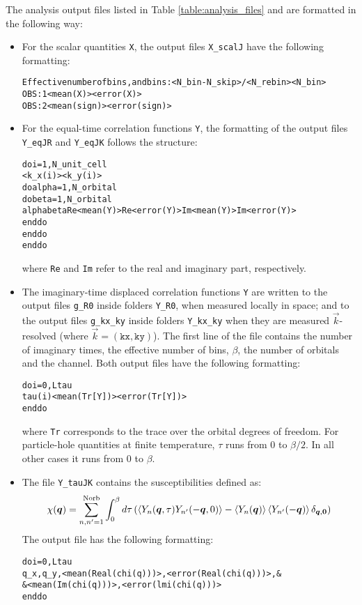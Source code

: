 %
The analysis output files listed in Table \ref{table:analysis_files} and are formatted in the following way:
\begin{itemize}
	\item For the scalar quantities \texttt{X}, the output files  \texttt{X\_scalJ} have the following formatting:
	{\small \begin{alltt}
		Effective number of bins, and bins:  <N_bin - N_skip>/<N_rebin>  <N_bin>	
		OBS :  1    <mean(X)>      <error(X)>	
		OBS :  2    <mean(sign)>   <error(sign)>
	\end{alltt} }
	
	\item For the equal-time correlation functions \texttt{Y}, the formatting of the output files \texttt{Y\_eqJR} and \texttt{Y\_eqJK} follows the structure:
	{\small \begin{alltt}
		do i = 1, N_unit_cell
		   <k_x(i)>   <k_y(i)>
		   do alpha = 1, N_orbital
		      do beta  = 1, N_orbital
		         alpha  beta  Re<mean(Y)>  Re<error(Y)>  Im<mean(Y)>  Im<error(Y)>
		      enddo
		   enddo
		enddo
	\end{alltt} }
	where \texttt{Re} and \texttt{Im} refer to the real and imaginary part, respectively.
	
	\item The imaginary-time displaced correlation functions \texttt{Y} are written to the output files \texttt{g\_R0} inside folders \texttt{Y\_R0}, when measured locally in space; 
	and to the output files \texttt{g\_kx\_ky} inside folders \texttt{Y\_kx\_ky} when they are measured $\vec{k}$-resolved (where $\vec{k}=(\texttt{kx}, \texttt{ky})$). 
	The first line of the file contains the  number of  imaginary times, the effective number of bins,  $\beta$, the number of orbitals and  the channel.  
	Both output files have the following formatting:
	{\small \begin{alltt}
		do i = 0, Ltau
		   tau(i)   <mean( Tr[Y] )>   <error( Tr[Y])>
		enddo
	\end{alltt} }
	where \texttt{Tr} corresponds to the trace over the orbital degrees of freedom.   For particle-hole quantities at finite temperature,  $\tau$ runs from 
	$0$ to $\beta/2$.   In all other cases it runs from $0$ to $\beta$. 
	
	\item The file  \texttt{Y\_tauJK}    contains the susceptibilities defined as: 
	\begin{equation}
	  \chi(\boldsymbol{q})   =   \sum_{n,n'=1}^{\text{Norb}}  \int_{0}^{\beta}   d \tau    \left(   \left<   Y_n(\boldsymbol{q},\tau) Y_{n'}(-\boldsymbol{q},0) \right>  - \left<   Y_n(\boldsymbol{q}) \right> \left< Y_{n'}(-\boldsymbol{q}) \right> \delta_{\boldsymbol{q},\boldsymbol{0}}  \right) 
	\end{equation}
	The output file 	has the following formatting:
	{\small \begin{alltt}
		do i = 0, Ltau
		   q_x, q_y, <mean(Real(chi(q)) )>,  <error(Real(chi(q)))>, & 
		           & <mean(Im  (chi(q)) )>,  <error(lmi (chi(q)))>
		enddo
	\end{alltt} }


\end{itemize}
